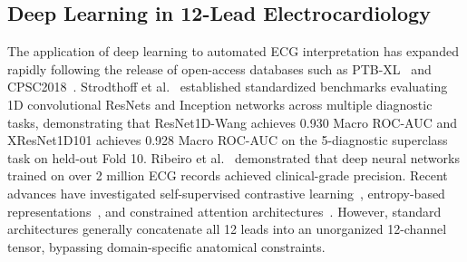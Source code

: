 \documentclass[12pt]{elsarticle}
\begin{document}
\subsection{Deep Learning in 12-Lead Electrocardiology}
The application of deep learning to automated ECG interpretation has expanded rapidly following the release of open-access databases such as PTB-XL~\cite{wagner2020ptb} and CPSC2018~\cite{liu2018open}. Strodthoff et al.~\cite{strodthoff2020deep} established standardized benchmarks evaluating 1D convolutional ResNets and Inception networks across multiple diagnostic tasks, demonstrating that ResNet1D-Wang achieves 0.930 Macro ROC-AUC and XResNet1D101 achieves 0.928 Macro ROC-AUC on the 5-diagnostic superclass task on held-out Fold 10. Ribeiro et al.~\cite{ribeiro2020automatic} demonstrated that deep neural networks trained on over 2 million ECG records achieved clinical-grade precision. Recent advances have investigated self-supervised contrastive learning~\cite{mehari2022self}, entropy-based representations~\cite{smigiel2021ecg}, and constrained attention architectures~\cite{che2021constrained}. However, standard architectures generally concatenate all 12 leads into an unorganized 12-channel tensor, bypassing domain-specific anatomical constraints.
\end{document}

